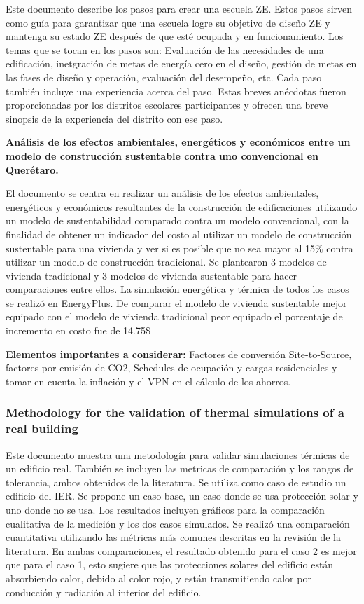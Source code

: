 Este documento describe los pasos para crear una escuela ZE. Estos pasos sirven como guía para garantizar que una escuela logre su objetivo de diseño ZE y mantenga su estado ZE después de que esté ocupada y en funcionamiento. Los temas que se tocan en los pasos son: Evaluación de las necesidades de una edificación, inetgración de metas de energía cero en el diseño, gestión de metas en las fases de diseño y operación, evaluación del desempeño, etc. Cada paso también incluye una experiencia acerca del paso. Estas breves anécdotas fueron proporcionadas por los distritos escolares participantes y ofrecen una breve sinopsis de la experiencia del distrito con ese paso.

\textbf{Análisis de los efectos ambientales, energéticos y económicos entre un modelo de construcción sustentable contra uno convencional en Querétaro.}

El documento se centra en realizar un análisis de los efectos ambientales, energéticos y económicos resultantes de la construcción de edificaciones utilizando un modelo de sustentabilidad comparado contra un modelo convencional, con la finalidad de obtener un indicador del costo al utilizar un modelo de construcción sustentable para una vivienda y ver si es posible que no sea mayor al 15$\%$ contra  utilizar un modelo de construcción tradicional. Se plantearon 3 modelos de vivienda tradicional y 3 modelos de vivienda sustentable para hacer comparaciones entre ellos. La simulación energética y térmica de todos los casos se realizó en EnergyPlus. De comparar el modelo de vivienda sustentable mejor equipado con el modelo de vivienda tradicional peor equipado el porcentaje de incremento en costo fue de 14.75\$%


\textbf{Elementos importantes a considerar:} Factores de conversión Site-to-Source, factores por emisión de CO2, Schedules de ocupación y cargas residenciales y tomar en cuenta la inflación y el VPN en el cálculo de los ahorros.


\subsubsection{Methodology for the validation of thermal simulations of a real building}

Este documento muestra una metodología para validar simulaciones térmicas de un edificio real. También se incluyen las metricas de comparación y los rangos de tolerancia, ambos obtenidos de la literatura. Se utiliza como caso de estudio un edificio del IER. Se propone un caso base, un caso donde se usa protección solar y uno donde no se usa. Los resultados incluyen gráficos para la comparación cualitativa de la medición y los dos casos simulados. Se realizó una comparación cuantitativa utilizando las métricas más comunes descritas en la revisión de la literatura. En ambas comparaciones, el resultado obtenido para el caso 2 es mejor que para el caso 1, esto sugiere que las protecciones solares del edificio están absorbiendo calor, debido al color rojo, y están transmitiendo calor por conducción y radiación al interior del edificio.


